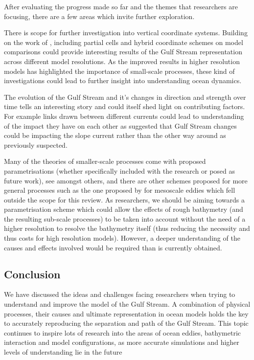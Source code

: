 \documentclass[a4paper,11pt]{article}
\begin{document}
After evaluating the progress made so far and the themes that researchers are focusing, there are a few areas which invite further exploration.

There is scope for further investigation into vertical coordinate systems. Building on the work of \citep{Ezer2016}, including partial cells and hybrid coordinate schemes on model comparisons could provide interesting results of the Gulf Stream representation across different model resolutions. As the improved results in higher resolution models has highlighted the importance of small-scale processes, these kind of investigations could lead to further insight into understanding ocean dynamics.

The evolution of the Gulf Stream and it's changes in direction and strength over time \citep{Greatbatch1991} tells an interesting story and could itself shed light on contributing factors. For example links drawn between different currents could lead to understanding of the impact they have on each other as \citep{Ezer2015} suggested that Gulf Stream changes could be impacting the slope current rather than the other way around as previously suspected.

Many of the theories of smaller-scale processes come with proposed parametrisations (whether specifically included with the research or posed as future work), see \citep{NaveiraGarabato2013} amongst others, and there are other schemes proposed for more general processes such as the one proposed by \citep{Anstey2016} for mesoscale eddies which fell outside the scope for this review. As researchers, we should be aiming towards a parametrisation scheme which could allow the effects of rough bathymetry (and the resulting sub-scale processes) to be taken into account without the need of a higher resolution to resolve the bathymetry itself (thus reducing the necessity and thus costs for high resolution models). However, a deeper understanding of the causes and effects involved would be required than is currently obtained.

\subsection{Conclusion}

We have discussed the ideas and challenges facing researchers when trying to understand and improve the model of the Gulf Stream. A combination of physical processes, their causes and ultimate representation in ocean models holds the key to accurately reproducing the separation and path of the Gulf Stream. This topic continues to inspire lots of research into the areas of ocean eddies, bathymetric interaction and model configurations, as more accurate simulations and higher levels of understanding lie in the future
\end{document}
